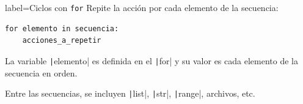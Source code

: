\begin{contentbox}{label=Ciclos con \texttt{for}}
    Repite la acción por cada elemento de la secuencia:
\begin{verbatim}
for elemento in secuencia:
    acciones_a_repetir
\end{verbatim}
    
    La variable \texttt|elemento| es definida en el \texttt|for| y su valor es cada elemento de la secuencia en orden.
    
    Entre las secuencias, se incluyen \texttt|list|, \texttt|str|, \texttt|range|, archivos, etc.
\end{contentbox}
